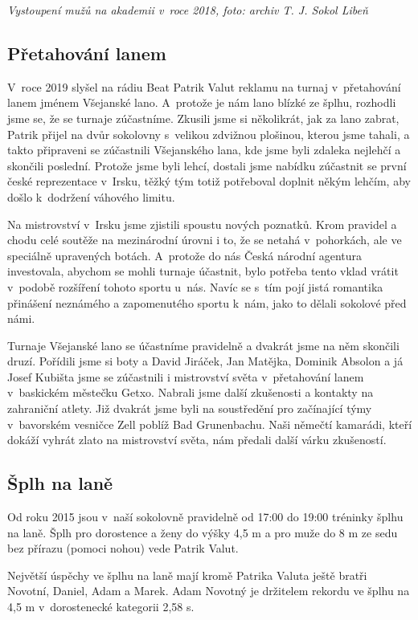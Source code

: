 \documentclass[a5paper, 11pt, twoside]{article}
\begin{document}
\textit{Vystoupení mužů na akademii v~roce 2018, foto: archiv T. J. Sokol
Libeň}

\subsection{Přetahování lanem}

V~roce 2019 slyšel na rádiu Beat Patrik Valut reklamu na turnaj
v~přetahování lanem jménem Všejanské lano. A~protože je nám lano blízké ze
šplhu, rozhodli jsme se, že se turnaje zúčastníme. Zkusili jsme si
několikrát, jak za lano zabrat, Patrik přijel na dvůr sokolovny
s~velikou zdvižnou plošinou, kterou jsme tahali, a takto připraveni se
zúčastnili Všejanského lana, kde jsme byli zdaleka nejlehčí a skončili
poslední. Protože jsme byli lehcí, dostali jsme nabídku zúčastnit se
první české reprezentace v~Irsku, těžký tým totiž potřeboval doplnit
někým lehčím, aby došlo k~dodržení váhového limitu.

Na mistrovství v~Irsku jsme zjistili spoustu nových poznatků. Krom
pravidel a chodu celé soutěže na mezinárodní úrovni i to, že se netahá
v~pohorkách, ale ve speciálně upravených botách. A~protože do nás Česká
národní agentura investovala, abychom se mohli turnaje účastnit, bylo
potřeba tento vklad vrátit v~podobě rozšíření tohoto sportu u~nás. Navíc
se s~tím pojí jistá romantika přinášení neznámého a zapomenutého sportu
k~nám, jako to dělali sokolové před námi.

Turnaje Všejanské lano se účastníme pravidelně a dvakrát jsme na něm
skončili druzí. Pořídili jsme si boty a David Jiráček, Jan Matějka,
Dominik Absolon a já Josef Kubišta jsme se zúčastnili i mistrovství
světa v~přetahování lanem v~baskickém městečku Getxo. Nabrali jsme další
zkušenosti a kontakty na zahraniční atlety. Již dvakrát jsme byli na
soustředění pro začínající týmy v~bavorském vesničce Zell poblíž Bad
Grunenbachu. Naši němečtí kamarádi, kteří dokáží vyhrát zlato na
mistrovství světa, nám předali další várku zkušeností.

\subsection{Šplh na laně}

Od roku 2015 jsou v~naší sokolovně pravidelně od 17:00 do 19:00 tréninky
šplhu na laně. Šplh pro dorostence a ženy do výšky 4,5 m a pro muže do 8
m ze sedu bez přírazu (pomoci nohou) vede Patrik Valut.

Největší úspěchy ve šplhu na laně mají kromě Patrika Valuta ještě bratři
Novotní, Daniel, Adam a Marek. Adam Novotný je držitelem rekordu ve
šplhu na 4,5 m v~dorostenecké kategorii 2,58 s.
\end{document}
